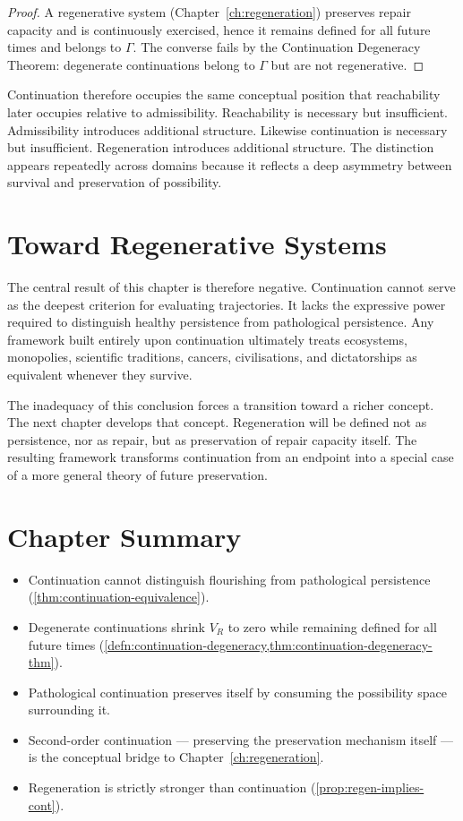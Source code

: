 \documentclass[12pt,twoside,openright]{book}
\newenvironment{chapsummary}{%
  \begin{tcolorbox}[colback=DistBlue!5,colframe=DistBlue,
    title={\faBookOpen\enspace Summary},
    fonttitle=\sffamily\bfseries\color{white},
    attach boxed title to top left={yshift=-2mm,xshift=4mm},
    boxed title style={colback=DistBlue,rounded corners}]
  \begin{itemize}[nosep,leftmargin=*]}{%
  \end{itemize}\end{tcolorbox}}
\newcounter{exercise}[chapter]
\begin{document}
\begin{proof}
  A regenerative system (Chapter~\ref{ch:regeneration})
  preserves repair capacity and is continuously exercised,
  hence it remains defined for all future times and belongs
  to $\Gamma$. The converse fails by the Continuation
  Degeneracy Theorem: degenerate continuations belong to
  $\Gamma$ but are not regenerative.
\end{proof}

Continuation therefore occupies the same conceptual
position that reachability later occupies relative to
admissibility. Reachability is necessary but insufficient.
Admissibility introduces additional structure. Likewise
continuation is necessary but insufficient. Regeneration
introduces additional structure. The distinction appears
repeatedly across domains because it reflects a deep
asymmetry between survival and preservation of possibility.

\section{Toward Regenerative Systems}
\label{sec:ch10-toward}

The central result of this chapter is therefore negative.
Continuation cannot serve as the deepest criterion for
evaluating trajectories. It lacks the expressive power
required to distinguish healthy persistence from
pathological persistence. Any framework built entirely upon
continuation ultimately treats ecosystems, monopolies,
scientific traditions, cancers, civilisations, and
dictatorships as equivalent whenever they survive.

The inadequacy of this conclusion forces a transition
toward a richer concept. The next chapter develops that
concept. Regeneration will be defined not as persistence,
nor as repair, but as preservation of repair capacity
itself. The resulting framework transforms continuation
from an endpoint into a special case of a more general
theory of future preservation.

\section*{Chapter Summary}
\begin{chapsummary}
  \item Continuation cannot distinguish flourishing from
        pathological persistence
        (\cref{thm:continuation-equivalence}).
  \item Degenerate continuations shrink $V_R$ to zero
        while remaining defined for all future times
        (\cref{defn:continuation-degeneracy,thm:continuation-degeneracy-thm}).
  \item Pathological continuation preserves itself by
        consuming the possibility space surrounding it.
  \item Second-order continuation --- preserving the
        preservation mechanism itself --- is the conceptual
        bridge to Chapter~\ref{ch:regeneration}.
  \item Regeneration is strictly stronger than continuation
        (\cref{prop:regen-implies-cont}).
\end{chapsummary}
\end{document}
